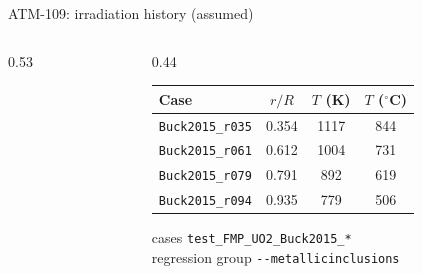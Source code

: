 \documentclass[aspectratio=169,10pt]{beamer}
\begin{document}
\begin{frame}{ATM-109: irradiation history (assumed)}
\begin{columns}[T]
\begin{column}{0.53\textwidth}
\begin{itemize}
      \end{itemize}
    \end{column}
    \begin{column}{0.44\textwidth}
      \centering\footnotesize
      \renewcommand{\arraystretch}{1.1}
      \begin{tabular}{@{}lccc@{}}
        \toprule
        Case & $r/R$ & $T$ (K) & $T$ ($^\circ$C) \\
        \midrule
        \texttt{Buck2015\_r035} & 0.354 & 1117 & 844 \\
        \texttt{Buck2015\_r061} & 0.612 & 1004 & 731 \\
        \texttt{Buck2015\_r079} & 0.791 & 892 & 619 \\
        \texttt{Buck2015\_r094} & 0.935 & 779 & 506 \\
        \bottomrule
      \end{tabular}\par\medskip
      {\scriptsize cases \texttt{test\_FMP\_UO2\_Buck2015\_*}\\ regression group \texttt{-{}-metallicinclusions}}
    \end{column}
  \end{columns}
\end{frame}
\end{document}
